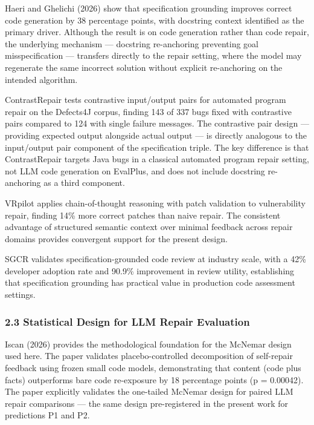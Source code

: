 Haeri and Ghelichi (2026) show that specification grounding improves correct code generation by 38 percentage points, with docstring context identified as the primary driver. Although the result is on code generation rather than code repair, the underlying mechanism --- docstring re-anchoring preventing goal misspecification --- transfers directly to the repair setting, where the model may regenerate the same incorrect solution without explicit re-anchoring on the intended algorithm.

ContrastRepair \citep{Kong2024ContrastRepair} tests contrastive input/output pairs for automated program repair on the Defects4J corpus, finding 143 of 337 bugs fixed with contrastive pairs compared to 124 with single failure messages. The contrastive pair design --- providing expected output alongside actual output --- is directly analogous to the input/output pair component of the specification triple. The key difference is that ContrastRepair targets Java bugs in a classical automated program repair setting, not LLM code generation on EvalPlus, and does not include docstring re-anchoring as a third component.

VRpilot \citep{Kulsum2024Case} applies chain-of-thought reasoning with patch validation to vulnerability repair, finding 14\% more correct patches than naive repair. The consistent advantage of structured semantic context over minimal feedback across repair domains provides convergent support for the present design.

SGCR \citep{Wang2025SGCR} validates specification-grounded code review at industry scale, with a 42\% developer adoption rate and 90.9\% improvement in review utility, establishing that specification grounding has practical value in production code assessment settings.

\subsubsection{2.3 Statistical Design for LLM Repair Evaluation}

Iscan (2026) provides the methodological foundation for the McNemar design used here. The paper validates placebo-controlled decomposition of self-repair feedback using frozen small code models, demonstrating that content (code plus facts) outperforms bare code re-exposure by 18 percentage points (p = 0.00042). The paper explicitly validates the one-tailed McNemar design for paired LLM repair comparisons --- the same design pre-registered in the present work for predictions P1 and P2.

